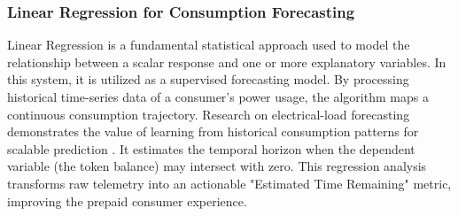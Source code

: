 \subsubsection{Linear Regression for Consumption Forecasting}
Linear Regression is a fundamental statistical approach used to model the relationship between a scalar response and one or more explanatory variables. In this system, it is utilized as a supervised forecasting model. By processing historical time-series data of a consumer's power usage, the algorithm maps a continuous consumption trajectory. Research on electrical-load forecasting demonstrates the value of learning from historical consumption patterns for scalable prediction \cite{gholizadeh2022federated,zheng2024federated}. It estimates the temporal horizon when the dependent variable (the token balance) may intersect with zero. This regression analysis transforms raw telemetry into an actionable "Estimated Time Remaining" metric, improving the prepaid consumer experience.

